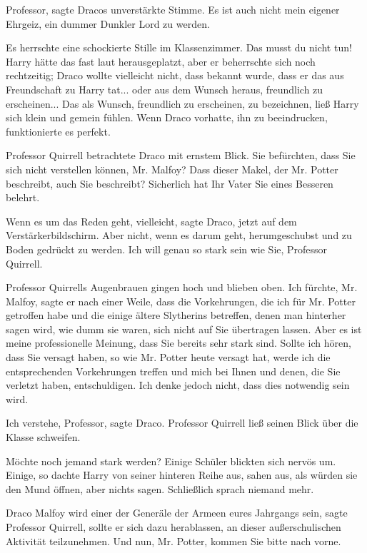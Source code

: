 \glqq Professor\grqq{}, sagte Dracos unverstärkte Stimme. \glqq Es ist auch
nicht mein eigener Ehrgeiz, ein dummer Dunkler Lord zu werden.\grqq{}

Es herrschte eine schockierte Stille im Klassenzimmer. Das musst du nicht tun!
Harry hätte das fast laut herausgeplatzt, aber er beherrschte sich noch
rechtzeitig; Draco wollte vielleicht nicht, dass bekannt wurde, dass er das aus
Freundschaft zu Harry tat... oder aus dem Wunsch heraus, freundlich zu
erscheinen... Das als Wunsch, freundlich zu erscheinen, zu bezeichnen, ließ
Harry sich klein und gemein fühlen. Wenn Draco vorhatte, ihn zu beeindrucken,
funktionierte es perfekt.

Professor Quirrell betrachtete Draco mit ernstem Blick. \glqq Sie befürchten,
dass Sie sich nicht verstellen können, Mr. Malfoy? Dass dieser Makel, der Mr.
Potter beschreibt, auch Sie beschreibt? Sicherlich hat Ihr Vater Sie eines
Besseren belehrt.\grqq{}

\glqq Wenn es um das Reden geht, vielleicht\grqq{}, sagte Draco, jetzt auf dem
Verstärkerbildschirm. \glqq Aber nicht, wenn es darum geht, herumgeschubst und
zu Boden gedrückt zu werden. Ich will genau so stark sein wie Sie, Professor
Quirrell.\grqq{}

Professor Quirrells Augenbrauen gingen hoch und blieben oben. \glqq Ich fürchte,
Mr. Malfoy\grqq{}, sagte er nach einer Weile, \glqq dass die Vorkehrungen, die
ich für Mr. Potter getroffen habe und die einige ältere Slytherins betreffen,
denen man hinterher sagen wird, wie dumm sie waren, sich nicht auf Sie
übertragen lassen. Aber es ist meine professionelle Meinung, dass Sie bereits
sehr stark sind. Sollte ich hören, dass Sie versagt haben, so wie Mr. Potter
heute versagt hat, werde ich die entsprechenden Vorkehrungen treffen und mich
bei Ihnen und denen, die Sie verletzt haben, entschuldigen. Ich denke jedoch
nicht, dass dies notwendig sein wird.\grqq{}

\glqq Ich verstehe, Professor\grqq{}, sagte Draco. Professor Quirrell ließ
seinen Blick über die Klasse schweifen.

\glqq Möchte noch jemand stark werden?\grqq{} Einige Schüler blickten sich
nervös um. Einige, so dachte Harry von seiner hinteren Reihe aus, sahen aus, als
würden sie den Mund öffnen, aber nichts sagen. Schließlich sprach niemand mehr.

\glqq Draco Malfoy wird einer der Generäle der Armeen eures Jahrgangs
sein\grqq{}, sagte Professor Quirrell, \glqq sollte er sich dazu herablassen, an
dieser außerschulischen Aktivität teilzunehmen. Und nun, Mr. Potter, kommen Sie
bitte nach vorne.\grqq{}

